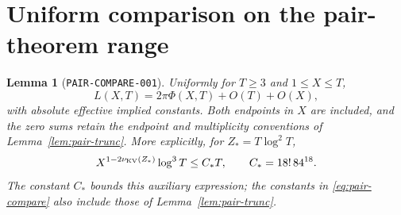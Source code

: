 \documentclass[11pt]{article}
\newtheorem{lemma}{Lemma}
\begin{document}
\section{Uniform comparison on the pair-theorem range}

\begin{lemma}[\texttt{PAIR-COMPARE-001}]\label{lem:pair-compare}
Uniformly for \(T\geq3\) and \(1\leq X\leq T\),
\begin{equation}\label{eq:pair-compare}
 L(X,T)=2\pi\Phi(X,T)+O(T)+O(X),
\end{equation}
with absolute effective implied constants. Both endpoints in \(X\)
are included, and the zero sums retain the endpoint and multiplicity
conventions of Lemma~\ref{lem:pair-trunc}.
More explicitly, for \(Z_*=T\log^2T\),
\begin{equation}\label{eq:compare-absorption}
 X^{1-2\nu_{\rm KV}(Z_*)}\log^3T
 \leq C_*T,\qquad C_*=18!\,84^{18}.
\end{equation}
The constant \(C_*\) bounds this auxiliary expression; the constants in
\eqref{eq:pair-compare} also include those of Lemma~\ref{lem:pair-trunc}.
\end{lemma}
\end{document}
